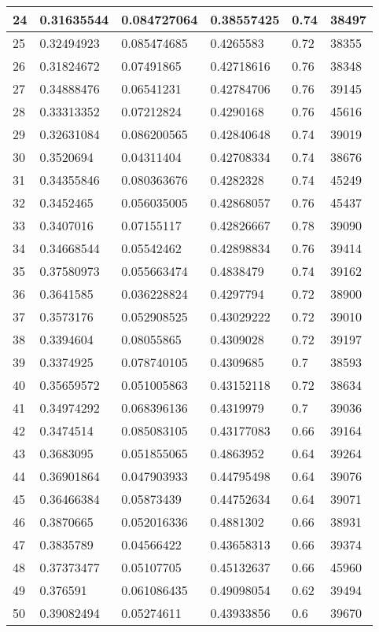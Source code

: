 \begin{longtable}{|l|l|l|l|l|l|}
24 & 0.31635544 & 0.084727064 & 0.38557425 & 0.74 & 38497 \\ \hline 
25 & 0.32494923 & 0.085474685 & 0.4265583 & 0.72 & 38355 \\ \hline 
26 & 0.31824672 & 0.07491865 & 0.42718616 & 0.76 & 38348 \\ \hline 
27 & 0.34888476 & 0.06541231 & 0.42784706 & 0.76 & 39145 \\ \hline 
28 & 0.33313352 & 0.07212824 & 0.4290168 & 0.76 & 45616 \\ \hline 
29 & 0.32631084 & 0.086200565 & 0.42840648 & 0.74 & 39019 \\ \hline 
30 & 0.3520694 & 0.04311404 & 0.42708334 & 0.74 & 38676 \\ \hline 
31 & 0.34355846 & 0.080363676 & 0.4282328 & 0.74 & 45249 \\ \hline 
32 & 0.3452465 & 0.056035005 & 0.42868057 & 0.76 & 45437 \\ \hline 
33 & 0.3407016 & 0.07155117 & 0.42826667 & 0.78 & 39090 \\ \hline 
34 & 0.34668544 & 0.05542462 & 0.42898834 & 0.76 & 39414 \\ \hline 
35 & 0.37580973 & 0.055663474 & 0.4838479 & 0.74 & 39162 \\ \hline 
36 & 0.3641585 & 0.036228824 & 0.4297794 & 0.72 & 38900 \\ \hline 
37 & 0.3573176 & 0.052908525 & 0.43029222 & 0.72 & 39010 \\ \hline 
38 & 0.3394604 & 0.08055865 & 0.4309028 & 0.72 & 39197 \\ \hline 
39 & 0.3374925 & 0.078740105 & 0.4309685 & 0.7 & 38593 \\ \hline 
40 & 0.35659572 & 0.051005863 & 0.43152118 & 0.72 & 38634 \\ \hline 
41 & 0.34974292 & 0.068396136 & 0.4319979 & 0.7 & 39036 \\ \hline 
42 & 0.3474514 & 0.085083105 & 0.43177083 & 0.66 & 39164 \\ \hline 
43 & 0.3683095 & 0.051855065 & 0.4863952 & 0.64 & 39264 \\ \hline 
44 & 0.36901864 & 0.047903933 & 0.44795498 & 0.64 & 39076 \\ \hline 
45 & 0.36466384 & 0.05873439 & 0.44752634 & 0.64 & 39071 \\ \hline 
46 & 0.3870665 & 0.052016336 & 0.4881302 & 0.66 & 38931 \\ \hline 
47 & 0.3835789 & 0.04566422 & 0.43658313 & 0.66 & 39374 \\ \hline 
48 & 0.37373477 & 0.05107705 & 0.45132637 & 0.66 & 45960 \\ \hline 
49 & 0.376591 & 0.061086435 & 0.49098054 & 0.62 & 39494 \\ \hline 
50 & 0.39082494 & 0.05274611 & 0.43933856 & 0.6 & 39670 \\ \hline 
\end{longtable}